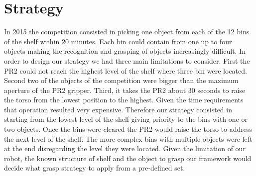 \section{Strategy}
\label{sec:strategy}

In 2015 the competition consisted in picking one object from each of the 12 bins of the shelf within 20 minutes. Each bin could contain from one up to four objects making the recognition and grasping of objects increasingly difficult. In order to design our strategy we had three main limitations to consider. First the PR2 could not reach the highest level of the shelf where three bin were located. Second two of the objects of the competition were bigger than the maximum aperture of the PR2 gripper. Third, it takes the PR2 about 30 seconds to raise the torso from the lowest position to the highest. Given the time requirements that operation resulted very expensive. Therefore our strategy consisted in starting from the lowest level of the shelf giving priority to the bins with one or two objects. Once the bins were cleared the PR2 would raise the torso to address the next level of the shelf. The more complex bins with multiple objects were left at the end disregarding the level they were located. Given the limitation of our robot, the known structure of shelf and the object to grasp our framework would decide what grasp strategy to apply from a pre-defined set.